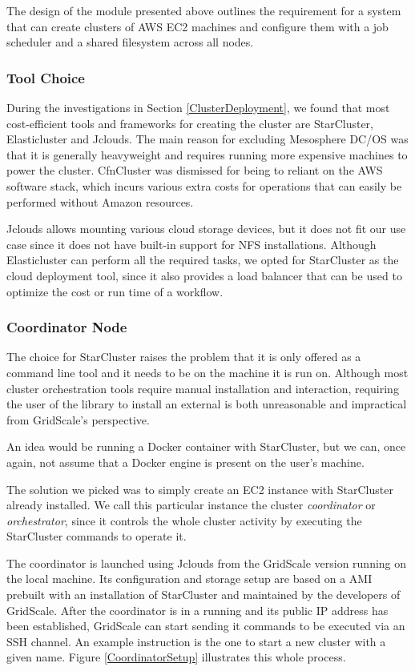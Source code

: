 The design of the module presented above outlines the requirement for a system that can create clusters of AWS EC2 machines and configure them with a job scheduler and a shared filesystem across all nodes.

\subsubsection{Tool Choice}

During the investigations in Section \ref{ClusterDeployment}, we found that most cost-efficient tools and frameworks for creating the cluster are StarCluster, Elasticluster and Jclouds. The main reason for excluding Mesosphere DC/OS was that it is generally heavyweight and requires running more expensive machines to power the cluster. CfnCluster was dismissed for being to reliant on the AWS software stack, which incurs various extra costs for operations that can easily be performed without Amazon resources.

Jclouds allows mounting various cloud storage devices, but it does not fit our use case since it does not have built-in support for NFS installations. Although Elasticluster can perform all the required tasks, we opted for StarCluster as the cloud deployment tool, since it also provides a load balancer that can be used to optimize the cost or run time of a workflow.

\subsubsection{Coordinator Node}

The choice for StarCluster raises the problem that it is only offered as a command line tool and it needs to be on the machine it is run on. Although most cluster orchestration tools require manual installation and interaction, requiring the user of the library to install an external is both unreasonable and impractical from GridScale's perspective. 

An idea would be running a Docker container with StarCluster, but we can, once again, not assume that a Docker engine is present on the user's machine.

The solution we picked was to simply create an EC2 instance with StarCluster already installed. We call this particular instance the cluster \textit{coordinator} or \textit{orchestrator}, since it controls the whole cluster activity by executing the StarCluster commands to operate it. 

The coordinator is launched using Jclouds from the GridScale version running on the local machine. Its configuration and storage setup are based on a AMI prebuilt with an installation of StarCluster and maintained by the developers of GridScale. After the coordinator is in a running and its public IP address has been established, GridScale can start sending it commands to be executed via an SSH channel. An example instruction is the one to start a new cluster with a given name. Figure \ref{CoordinatorSetup} illustrates this whole process.

